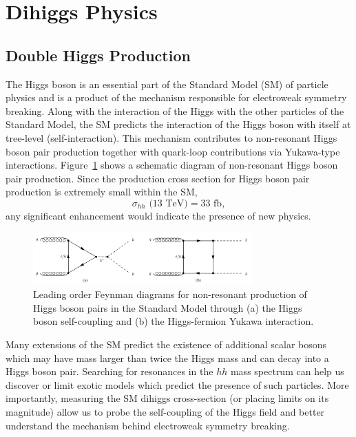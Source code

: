 \section{Dihiggs Physics}
\subsection{Double Higgs Production}
\label{sec:physics}
The Higgs boson is an essential part of the Standard Model (SM) of particle physics and is a product of the mechanism responsible for electroweak symmetry breaking. Along with the interaction of the Higgs with the other particles of the Standard Model, the SM predicts the interaction of the Higgs boson with itself at tree-level (self-interaction). This mechanism contributes to non-resonant Higgs boson pair production together with quark-loop contributions via Yukawa-type interactions. Figure~\ref{fig:nr_hh_production} shows a schematic diagram of non-resonant Higgs boson pair production. Since the production cross section for Higgs boson pair production is extremely small within the SM, 
\begin{equation*}
\sigma_{hh}\text{ (13 TeV)} = 33 \text{ fb},
\end{equation*}
any significant enhancement would indicate the presence of new physics.

\begin{figure}[!h] 
\begin{center}
\includegraphics*[width=0.75\textwidth] {dihiggsPhys/figures/nr-diHiggs-production.png}
\caption{Leading order Feynman diagrams for non-resonant production of Higgs
  boson pairs in the Standard Model through (a) the Higgs boson self-coupling
  and (b) the Higgs-fermion Yukawa interaction.} 
  \label{fig:nr_hh_production}
\end{center}
\end{figure}

Many extensions of the SM predict the existence of additional scalar bosons which may have mass larger than twice the Higgs mass and can decay into a Higgs boson pair. Searching for resonances in the $hh$ mass spectrum can help us discover or limit exotic models which predict the presence of such particles. More importantly, measuring the SM dihiggs cross-section (or placing limits on its magnitude) allow us to probe the self-coupling of the Higgs field and better understand the mechanism behind electroweak symmetry breaking.

